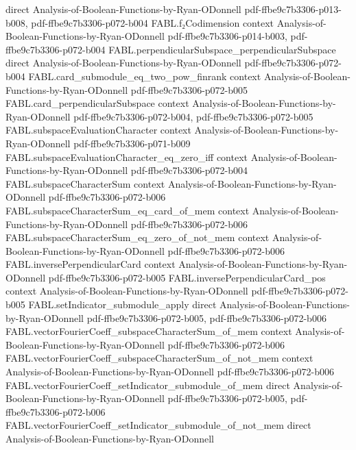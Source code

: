\begin{theorem}
  {direct}
  {Analysis-of-Boolean-Functions-by-Ryan-ODonnell}
  {pdf-ffbe9c7b3306-p013-b008,
    pdf-ffbe9c7b3306-p072-b004}
\proofstep
  {FABL.f₂Codimension}
  {context}
  {Analysis-of-Boolean-Functions-by-Ryan-ODonnell}
  {pdf-ffbe9c7b3306-p014-b003,
    pdf-ffbe9c7b3306-p072-b004}
\proofstep
  {FABL.perpendicularSubspace_perpendicularSubspace}
  {direct}
  {Analysis-of-Boolean-Functions-by-Ryan-ODonnell}
  {pdf-ffbe9c7b3306-p072-b004}
\proofstep
  {FABL.card_submodule_eq_two_pow_finrank}
  {context}
  {Analysis-of-Boolean-Functions-by-Ryan-ODonnell}
  {pdf-ffbe9c7b3306-p072-b005}
\proofstep
  {FABL.card_perpendicularSubspace}
  {context}
  {Analysis-of-Boolean-Functions-by-Ryan-ODonnell}
  {pdf-ffbe9c7b3306-p072-b004,
    pdf-ffbe9c7b3306-p072-b005}
\proofstep
  {FABL.subspaceEvaluationCharacter}
  {context}
  {Analysis-of-Boolean-Functions-by-Ryan-ODonnell}
  {pdf-ffbe9c7b3306-p071-b009}
\proofstep
  {FABL.subspaceEvaluationCharacter_eq_zero_iff}
  {context}
  {Analysis-of-Boolean-Functions-by-Ryan-ODonnell}
  {pdf-ffbe9c7b3306-p072-b004}
\proofstep
  {FABL.subspaceCharacterSum}
  {context}
  {Analysis-of-Boolean-Functions-by-Ryan-ODonnell}
  {pdf-ffbe9c7b3306-p072-b006}
\proofstep
  {FABL.subspaceCharacterSum_eq_card_of_mem}
  {context}
  {Analysis-of-Boolean-Functions-by-Ryan-ODonnell}
  {pdf-ffbe9c7b3306-p072-b006}
\proofstep
  {FABL.subspaceCharacterSum_eq_zero_of_not_mem}
  {context}
  {Analysis-of-Boolean-Functions-by-Ryan-ODonnell}
  {pdf-ffbe9c7b3306-p072-b006}
\proofstep
  {FABL.inversePerpendicularCard}
  {context}
  {Analysis-of-Boolean-Functions-by-Ryan-ODonnell}
  {pdf-ffbe9c7b3306-p072-b005}
\proofstep
  {FABL.inversePerpendicularCard_pos}
  {context}
  {Analysis-of-Boolean-Functions-by-Ryan-ODonnell}
  {pdf-ffbe9c7b3306-p072-b005}
\proofstep
  {FABL.setIndicator_submodule_apply}
  {direct}
  {Analysis-of-Boolean-Functions-by-Ryan-ODonnell}
  {pdf-ffbe9c7b3306-p072-b005,
    pdf-ffbe9c7b3306-p072-b006}
\proofstep
  {FABL.vectorFourierCoeff_subspaceCharacterSum_of_mem}
  {context}
  {Analysis-of-Boolean-Functions-by-Ryan-ODonnell}
  {pdf-ffbe9c7b3306-p072-b006}
\proofstep
  {FABL.vectorFourierCoeff_subspaceCharacterSum_of_not_mem}
  {context}
  {Analysis-of-Boolean-Functions-by-Ryan-ODonnell}
  {pdf-ffbe9c7b3306-p072-b006}
\proofstep
  {FABL.vectorFourierCoeff_setIndicator_submodule_of_mem}
  {direct}
  {Analysis-of-Boolean-Functions-by-Ryan-ODonnell}
  {pdf-ffbe9c7b3306-p072-b005,
    pdf-ffbe9c7b3306-p072-b006}
\proofstep
  {FABL.vectorFourierCoeff_setIndicator_submodule_of_not_mem}
  {direct}
  {Analysis-of-Boolean-Functions-by-Ryan-ODonnell}

\end{theorem}
